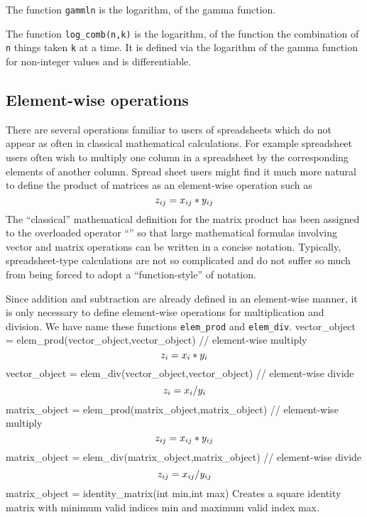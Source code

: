 The function {\tt gammln} is the logarithm, of the gamma function.

The function {\tt log\_comb(n,k)} is the logarithm, of the  function
the combination of {\tt n} things taken {\tt k} at a time.
It is defined via the logarithm of the gamma function 
for non-integer values 
and is differentiable.


\subsection{Element-wise operations}
There are several operations familiar to users of spreadsheets which do
not appear as often in classical mathematical 
calculations. For example spreadsheet users often
wish to multiply one column in a spreadsheet by the corresponding
elements of another column. Spread sheet users might find it much more
natural to define the product of matrices as an element-wise operation
such as
$$\leftset{z_{ij}= x_{ij}*y_{ij}}$$
The ``classical'' mathematical definition for the
matrix product has been assigned to the overloaded operator ``{\tt *}''
so that large mathematical formulas involving
vector and matrix operations can be written in a concise notation.
Typically, spreadsheet-type calculations are not so complicated
and do not suffer so much from being forced to adopt a
``function-style'' of notation.

Since addition and subtraction are already defined in an element-wise manner,
it is only necessary to define element-wise operations 
for multiplication and
division. We have name these functions {\tt elem\_prod} and {\tt elem\_div}.
\beginexample
vector_object = elem_prod(vector_object,vector_object) // element-wise multiply 
\endexampledf
$$\leftset{z_i= x_i*y_i}$$
\beginexample
vector_object = elem_div(vector_object,vector_object) // element-wise divide
\endexampledf
$$\leftset{z_i= x_i/y_i}$$
\beginexample
matrix_object = elem_prod(matrix_object,matrix_object) // element-wise multiply 
\endexampledf
$$\leftset{z_{ij}= x_{ij}*y_{ij}}$$
\beginexample
matrix_object = elem_div(matrix_object,matrix_object) // element-wise divide
\endexampledf
$$\leftset{z_{ij}= x_{ij}/y_{ij}}$$
\beginexample
matrix_object = identity_matrix(int min,int max)
\endexample
\noindent Creates a square identity matrix with minimum valid indices min and 
maximum valid index max.

